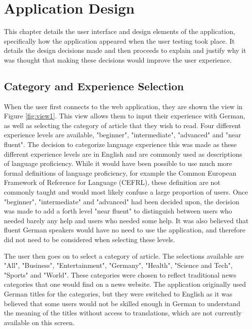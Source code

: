 \chapter{Application Design}

This chapter details the user interface and design elements of the application, specifically how the application appeared when the user testing took place. It details the design decisions made and then proceeds to explain and justify why it was thought that making these decisions would improve the user experience.

\section{Category and Experience Selection}

When the user first connects to the web application, they are shown the view in Figure \ref{fig:view1}. This view allows them to input their experience with German, as well as selecting the category of article that they wish to read. Four different experience levels are available, "beginner", "intermediate", "advanced" and "near fluent". The decision to categorize language experience this was made as these different experience levels are in English and are commonly used as descriptions of language proficiency. While it would have been possible to use much more formal definitions of language proficiency, for example the Common European Framework of Reference for Language (CEFRL), these definition are not commonly taught and would most likely confuse a large proportion of users. Once "beginner", "intermediate" and "advanced" had been decided upon, the decision was made to add a forth level "near fluent" to distinguish between users who needed barely any help and users who needed some help. It was also believed that fluent German speakers would have no need to use the application, and therefore did not need to be considered when selecting these levels.



The user then goes on to select a category of article. The selections available are "All", "Business", "Entertainment", "Germany", "Health", "Science and Tech", "Sports" and "World". These categories were chosen to reflect traditional news categories that one would find on a news website. The application originally used German titles for the categories, but they were switched to English as it was believed that some users would not be skilled enough in German to understand the meaning of the titles without access to translations, which are not currently available on this screen. 

